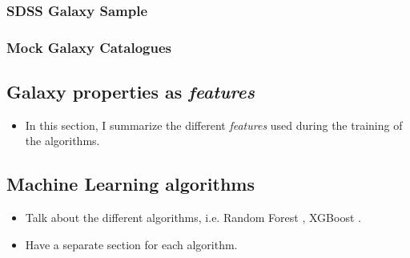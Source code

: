 \documentclass[useAMS,usenatbib, usedcolumn]{mnras}
\begin{document}
\subsubsection{SDSS Galaxy Sample}
\label{subsubsec:NYU_DR7}


\subsubsection{Mock Galaxy Catalogues}
\label{subsubsec:Mock_Catls}


\subsection{Galaxy properties as \textit{features}}
\label{subsec:galprop_features}

\begin{itemize}[leftmargin=0.5\parindent, labelsep=0.5\parindent]
    \item
    In this section, I summarize the different \textit{features} used
    during the training of the algorithms.

\end{itemize}

\subsection{Machine Learning algorithms}
\label{subsec:ml_algorithms}

\begin{itemize}[leftmargin=0.5\parindent, labelsep=0.5\parindent]
    \item
    Talk about the different algorithms, i.e. Random Forest
    \citet{Breiman2001}, XGBoost \citep{Chen2016}.

    \item Have a separate section for each algorithm.
\end{itemize}
\end{document}
